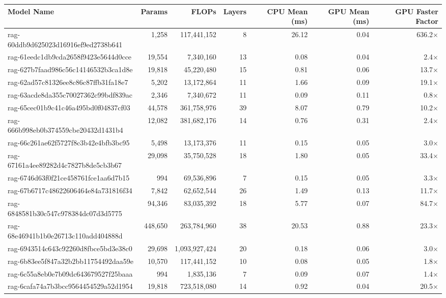 \begin{table}[h!]
\centering
\fontsize{7}{9}\selectfont
\begin{tabular}{lrrrrrr}
\toprule
\textbf{Model Name} & \textbf{Params} & \textbf{FLOPs} & \textbf{Layers} & \textbf{CPU Mean (ms)} & \textbf{GPU Mean (ms)} & \textbf{GPU Faster Factor} \\
\midrule
rag-60ddb9d625023d16916ef9ed2738b641 & 1,258 & 117,441,152 & 8 & 26.12 & 0.04 & 636.2$\times$ \\
rag-61eedc1db9cda2658f9423e5644d0cce & 19,554 & 7,340,160 & 13 & 0.08 & 0.04 & 2.4$\times$ \\
rag-627b7faad986c56c14146532b3ca1d8e & 19,818 & 45,220,480 & 15 & 0.81 & 0.06 & 13.7$\times$ \\
rag-62ad57c81326ee8c86c87ffb31fa18e7 & 5,202 & 13,172,864 & 11 & 1.66 & 0.09 & 19.1$\times$ \\
rag-63acde8da355c70027362c99bdf839ac & 2,346 & 7,340,672 & 11 & 0.09 & 0.11 & 0.8$\times$ \\
rag-65cec01b9c41c46a495bd0f04837cf03 & 44,578 & 361,758,976 & 39 & 8.07 & 0.79 & 10.2$\times$ \\
rag-666b998eb0b374559cbe20432d1431b4 & 12,082 & 381,682,176 & 14 & 0.76 & 0.31 & 2.4$\times$ \\
rag-66c261ae62f5727f8c3b42e4bfb3bc95 & 5,498 & 13,173,376 & 11 & 0.15 & 0.05 & 3.0$\times$ \\
rag-67161a4ee89282d4c7827b8de5cb3b67 & 29,098 & 35,750,528 & 18 & 1.80 & 0.05 & 33.4$\times$ \\
rag-6746d63f0f21ce458761fce1aa6d7b15 & 994 & 69,536,896 & 7 & 0.15 & 0.05 & 3.3$\times$ \\
rag-67b6717c48622606464e84a731816f34 & 7,842 & 62,652,544 & 26 & 1.49 & 0.13 & 11.7$\times$ \\
rag-6848581b30c547c978384dc07d3d5775 & 94,346 & 83,035,392 & 18 & 5.77 & 0.07 & 84.7$\times$ \\
rag-68e46941b1b0e26713c110add404888d & 448,650 & 263,784,960 & 38 & 20.53 & 0.88 & 23.3$\times$ \\
rag-6943514c643c92260d8fbce5bd3e38c0 & 29,698 & 1,093,927,424 & 20 & 0.18 & 0.06 & 3.0$\times$ \\
rag-6b83ee5f847a32b2bb11754492daa59e & 10,570 & 117,441,152 & 10 & 0.08 & 0.05 & 1.8$\times$ \\
rag-6c55a8eb0e7b09dc643679527f25baaa & 994 & 1,835,136 & 7 & 0.09 & 0.07 & 1.4$\times$ \\
rag-6cafa74a7b3bcc9564454529a52d1954 & 19,818 & 723,518,080 & 14 & 0.92 & 0.04 & 20.5$\times$ \\

\end{tabular}
\end{table}
